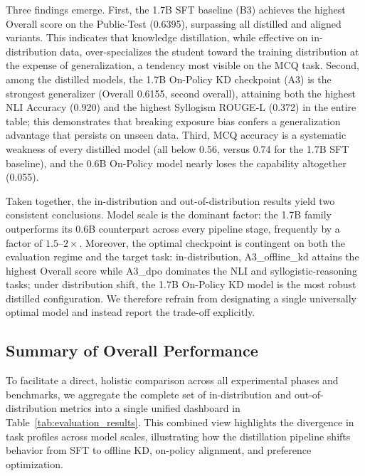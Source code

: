 Three findings emerge. First, the 1.7B SFT baseline (B3) achieves the highest Overall score on the Public-Test (0.6395), surpassing all distilled and aligned variants. This indicates that knowledge distillation, while effective on in-distribution data, over-specializes the student toward the training distribution at the expense of generalization, a tendency most visible on the MCQ task. Second, among the distilled models, the 1.7B On-Policy KD checkpoint (A3) is the strongest generalizer (Overall 0.6155, second overall), attaining both the highest NLI Accuracy (0.920) and the highest Syllogism ROUGE-L (0.372) in the entire table; this demonstrates that breaking exposure bias confers a generalization advantage that persists on unseen data. Third, MCQ accuracy is a systematic weakness of every distilled model (all below 0.56, versus 0.74 for the 1.7B SFT baseline), and the 0.6B On-Policy model nearly loses the capability altogether (0.055).

Taken together, the in-distribution and out-of-distribution results yield two consistent conclusions. Model scale is the dominant factor: the 1.7B family outperforms its 0.6B counterpart across every pipeline stage, frequently by a factor of $1.5$–$2\times$. Moreover, the optimal checkpoint is contingent on both the evaluation regime and the target task: in-distribution, A3\_offline\_kd attains the highest Overall score while A3\_dpo dominates the NLI and syllogistic-reasoning tasks; under distribution shift, the 1.7B On-Policy KD model is the most robust distilled configuration. We therefore refrain from designating a single universally optimal model and instead report the trade-off explicitly.

\subsection{Summary of Overall Performance}

To facilitate a direct, holistic comparison across all experimental phases and benchmarks, we aggregate the complete set of in-distribution and out-of-distribution metrics into a single unified dashboard in Table~\ref{tab:evaluation_results}. This combined view highlights the divergence in task profiles across model scales, illustrating how the distillation pipeline shifts behavior from SFT to offline KD, on-policy alignment, and preference optimization.

